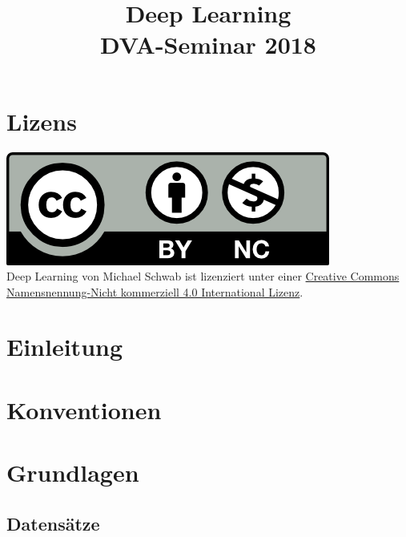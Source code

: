 \documentclass[conference, german]{IEEEtran}
\begin{document}
\title{Deep Learning\\
{\footnotesize DVA-Seminar 2018}
}
\author{
}

\maketitle
\renewcommand{\abstractname}{Zusammenfassung}



\begin{abstract}
\end{abstract}

\section*{Lizens}
\href{http://creativecommons.org/licenses/by-nc/4.0/}{\includegraphics{img/by-nc.png}}\\
{Deep Learning} von {Michael Schwab} ist lizenziert unter einer
\href{http://creativecommons.org/licenses/by-nc/4.0/}{Creative Commons
	Namensnennung-Nicht kommerziell 4.0 International Lizenz}.
\section{Einleitung} 
\section{Konventionen}
\section{Grundlagen}
\subsection{Datensätze}
\end{document}

